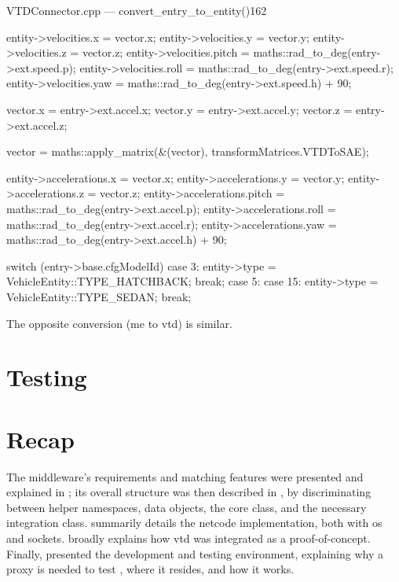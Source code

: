 \begin{codelist}{VTDConnector.cpp --- convert\_entry\_to\_entity()}{162}
{{		entity->velocities.x     = vector.x;
		entity->velocities.y     = vector.y;
		entity->velocities.z     = vector.z;
		entity->velocities.pitch = maths::rad_to_deg(entry->ext.speed.p);
		entity->velocities.roll  = maths::rad_to_deg(entry->ext.speed.r);
		entity->velocities.yaw   = maths::rad_to_deg(entry->ext.speed.h) + 90;

		vector.x = entry->ext.accel.x;
		vector.y = entry->ext.accel.y;
		vector.z = entry->ext.accel.z;

		vector = maths::apply_matrix(&(vector), transformMatrices.VTDToSAE);

		entity->accelerations.x     = vector.x;
		entity->accelerations.y     = vector.y;
		entity->accelerations.z     = vector.z;
		entity->accelerations.pitch = maths::rad_to_deg(entry->ext.accel.p);
		entity->accelerations.roll  = maths::rad_to_deg(entry->ext.accel.r);
		entity->accelerations.yaw   = maths::rad_to_deg(entry->ext.accel.h) + 90;
	}

	switch (entry->base.cfgModelId) {
		case 3:
			entity->type = VehicleEntity::TYPE_HATCHBACK;
			break;
		case 5:
		case 15:
			entity->type = VehicleEntity::TYPE_SEDAN;
			break;
	}
}
\end{codelist}

The opposite conversion (\gls{me} to \gls{vtd}) is similar.

\section{Testing}\label{sc:middleware:testing}

\section{Recap}\label{sc:middleware:recap}

The \gls{middleware}'s requirements and matching features were presented and explained in ; its overall structure was then described in , by discriminating between helper namespaces, data objects, the core class, and the necessary integration class.  summarily details the \gls{netcode} implementation, both with \gls{os} and  sockets.  broadly explains how \gls{vtd} was integrated as a proof-of-concept. Finally,  presented the development and testing environment, explaining why a \gls{proxy} is needed to test , where it resides, and how it works.
